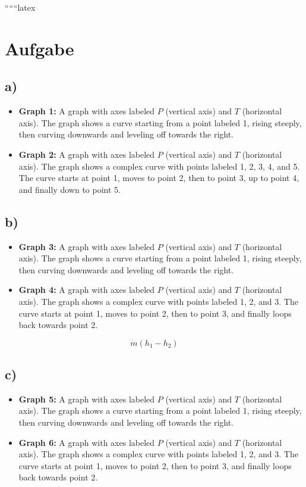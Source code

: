 
``````latex


\section*{Aufgabe}

\subsection*{a)}

\begin{itemize}
    \item \textbf{Graph 1:} A graph with axes labeled $P$ (vertical axis) and $T$ (horizontal axis). The graph shows a curve starting from a point labeled 1, rising steeply, then curving downwards and leveling off towards the right.
    \item \textbf{Graph 2:} A graph with axes labeled $P$ (vertical axis) and $T$ (horizontal axis). The graph shows a complex curve with points labeled 1, 2, 3, 4, and 5. The curve starts at point 1, moves to point 2, then to point 3, up to point 4, and finally down to point 5.
\end{itemize}

\subsection*{b)}

\begin{itemize}
    \item \textbf{Graph 3:} A graph with axes labeled $P$ (vertical axis) and $T$ (horizontal axis). The graph shows a curve starting from a point labeled 1, rising steeply, then curving downwards and leveling off towards the right.
    \item \textbf{Graph 4:} A graph with axes labeled $P$ (vertical axis) and $T$ (horizontal axis). The graph shows a complex curve with points labeled 1, 2, and 3. The curve starts at point 1, moves to point 2, then to point 3, and finally loops back towards point 2.
\end{itemize}

\[
\dot{m} (h_1 - h_2)
\]

\subsection*{c)}

\begin{itemize}
    \item \textbf{Graph 5:} A graph with axes labeled $P$ (vertical axis) and $T$ (horizontal axis). The graph shows a curve starting from a point labeled 1, rising steeply, then curving downwards and leveling off towards the right.
    \item \textbf{Graph 6:} A graph with axes labeled $P$ (vertical axis) and $T$ (horizontal axis). The graph shows a complex curve with points labeled 1, 2, and 3. The curve starts at point 1, moves to point 2, then to point 3, and finally loops back towards point 2.
\end{itemize}


